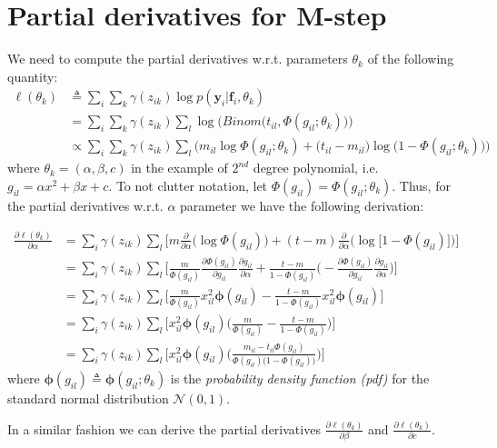 \chapter{Partial derivatives for M-step} \label{derivatives-m-step-chapter}
We need to compute the partial derivatives w.r.t. parameters $\theta_{k}$ of the following quantity:
\begin{equation} \label{parameters-est2-EM-f-app}
  \begin{split}
	\ell(\theta_{k}) & \triangleq \sum_{i} \sum_{k} \gamma(z_{ik}) \log p(\mathbf{y}_{i}|\mathbf{f}_{i}, \theta_{k}) \\
					 & = \sum_{i} \sum_{k} \gamma(z_{ik}) \sum_{l} \log \bigg(Binom \big(t_{il}, \Phi(g_{il}; \theta_{k})\big) \bigg) \\
					 & \propto  \sum_{i} \sum_{k} \gamma(z_{ik}) \sum_{l} \bigg(m_{il} \log \Phi(g_{il}; \theta_{k}) + \big(t_{il} - m_{il} \big) \log \big(1 - \Phi(g_{il}; \theta_{k})\big)\bigg)
  \end{split}
\end{equation}
where $\theta_{k} = (\alpha, \beta, c)$ in the example of $2^{nd}$ degree polynomial, i.e. $g_{il} = \alpha x^{2} + \beta x + c$. To not clutter notation, let $\Phi(g_{il}) = \Phi(g_{il}; \theta_{k})$. Thus, for the partial derivatives w.r.t. $\alpha$ parameter we have the following derivation:

\begin{equation} \label{derivative-a-f-app}
  \begin{split}
	\frac{\partial \ell(\theta_{k})}{\partial \alpha} & = \sum_{i} \gamma(z_{ik}) \sum_{l} \bigg[ m \frac{\partial}{\partial \alpha}\big(\log \Phi(g_{il})\big) + (t-m) \frac{\partial}{\partial \alpha}\big(\log \big[1 - \Phi(g_{il})\big]\big)\bigg] \\
		& = \sum_{i} \gamma(z_{ik}) \sum_{l} \bigg[ \frac{m}{\Phi(g_{il})} \frac{\partial \Phi(g_{il})}{\partial g_{il}} \frac{\partial g_{il}}{\partial \alpha} + \frac{t - m}{1 - \Phi(g_{il})}\bigg( -\frac{\partial \Phi(g_{il})}{\partial g_{il}} \frac{\partial g_{il}}{\partial \alpha} \bigg) \bigg] \\
		& = \sum_{i} \gamma(z_{ik}) \sum_{l} \bigg[ \frac{m}{\Phi(g_{il})} x_{il}^{2} \mathbf{\phi}(g_{il}) - \frac{t - m}{1 - \Phi(g_{il})} x_{il}^{2} \mathbf{\phi}(g_{il}) \bigg]\\
		& = \sum_{i}  \gamma(z_{ik}) \sum_{l} \bigg[ x_{il}^{2} \mathbf{\phi}(g_{il})\bigg(\frac{m}{\Phi(g_{il})} - \frac{t - m}{1 - \Phi(g_{il})}\bigg) \bigg] \\
		& = \sum_{i}  \gamma(z_{ik}) \sum_{l} \bigg[ x_{il}^{2} \mathbf{\phi}(g_{il})\bigg(\frac{m_{il} - t_{il}\Phi(g_{il})}{\Phi(g_{il})\big(1-\Phi(g_{il})\big)} \bigg) \bigg]
	\end{split}
\end{equation}
where $\mathbf{\phi}(g_{il}) \triangleq \mathbf{\phi}(g_{il};\theta_{k})$ is the \emph{probability density function (pdf)} for the standard normal distribution $\mathcal{N}(0,1)$.

In a similar fashion we can derive the partial derivatives $\frac{\partial \ell(\theta_{k})}{\partial \beta}$ and $\frac{\partial \ell(\theta_{k})}{\partial c}$.